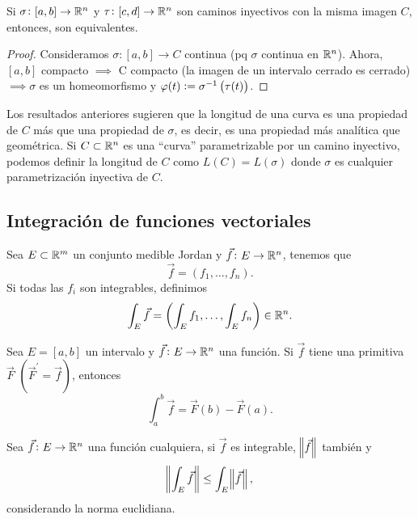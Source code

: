 \begin{prop}
    Si $\sigma \colon [a, b] \to \mathbb{R}^n$ y $\tau \colon [c,d] \to \mathbb{R}^n$ son caminos inyectivos con la misma imagen $C$, entonces, son equivalentes.
\end{prop}

\begin{proof}
    Consideramos $\sigma \colon [a,b] \to C$ continua (pq $\sigma$ continua en $\mathbb{R}^n$). Ahora, $[a, b]$ compacto $\implies$ C compacto
    (la imagen de un intervalo cerrado es cerrado) $\implies \sigma$ es un homeomorfismo y $\varphi(t) := \sigma^{-1}\left( \tau(t) \right)$.
\end{proof}

\begin{obs}
    Los resultados anteriores sugieren que la longitud de una curva es una propiedad de $C$ más que una propiedad de $\sigma$, es decir,
    es una propiedad más analítica que geom\'etrica. Si $C \subset \mathbb{R}^n$ es una ``curva'' parametrizable por un camino inyectivo,
    podemos definir la longitud de $C$ como $L(C) = L(\sigma)$ donde $\sigma$ es cualquier parametrización inyectiva de $C$.
\end{obs}

\subsection*{Integración de funciones vectoriales}

\begin{defi*}
    Sea $E \subset \mathbb{R}^m$ un conjunto medible Jordan y $\vec{f} \colon E \to \mathbb{R}^n$, tenemos que
    \[
        \vec{f} = \left( f_1,\dots, f_n \right).
    \]
    Si todas las $f_i$ son integrables, definimos
    \[
        \int_E \vec{f} = \left( \int_E f_1 , \dots, \int_E f_n \right) \in \mathbb{R}^n.
    \]
\end{defi*}

\begin{prop*}\label{prop:regla_barrow}
    Sea $E = [a, b]$ un intervalo y $\vec{f} \colon E \to \mathbb{R}^n$ una función. Si $\vec{f}$ tiene una primitiva $\vec{F}$
    $\left( \vec{F}^\prime = \vec{f}\right)$, entonces
    \[
        \int^b_a \vec{f} = \vec{F}(b) - \vec{F}(a).
    \]
\end{prop*}

\begin{prop*}
    Sea $\vec{f} \colon E \to \mathbb{R}^n$ una función cualquiera, si $\vec{f}$ es integrable, $\norm{\vec{f}}$ tambi\'en y
    \[
        \norm{\int_E \vec{f}} \leq \int_E \norm{\vec{f}},
    \]
    considerando la norma euclidiana.
\end{prop*}

